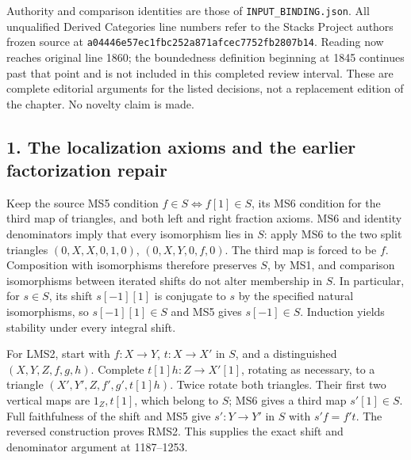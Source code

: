 \documentclass[11pt]{article}
\begin{document}
Authority and comparison identities are those of \texttt{INPUT\_\allowbreak{}BINDING.\allowbreak{}json}. All unqualified Derived Categories line numbers refer to the Stacks Project authors\textquotesingle{} frozen source at \texttt{a04446e5\allowbreak{}7ec1fbc2\allowbreak{}52a871af\allowbreak{}cec7752f\allowbreak{}b2807b14}. Reading now reaches original line 1860; the boundedness definition beginning at 1845 continues past that point and is not included in this completed review interval. These are complete editorial arguments for the listed decisions,\allowbreak{} not a replacement edition of the chapter. No novelty claim is made.

\subsection{1. The localization axioms and the earlier factorization repair}\label{proofs-1149-1843-the-localization-axioms-and-the-earlier-factorization-repair}

Keep the source MS5 condition \(f\in S\iff f[1]\in S\),\allowbreak{} its MS6 condition for the third map of triangles,\allowbreak{} and both left and right fraction axioms. MS6 and identity denominators imply that every isomorphism lies in \(S\):\allowbreak{} apply MS6 to the two split triangles \((0,X,X,0,1,0)\),\allowbreak{} \((0,X,Y,0,f,0)\). The third map is forced to be \(f\). Composition with isomorphisms therefore preserves \(S\),\allowbreak{} by MS1,\allowbreak{} and comparison isomorphisms between iterated shifts do not alter membership in \(S\). In particular,\allowbreak{} for \(s\in S\),\allowbreak{} its shift \(s[-1][1]\) is conjugate to \(s\) by the specified natural isomorphisms,\allowbreak{} so \(s[-1][1]\in S\) and MS5 gives \(s[-1]\in S\). Induction yields stability under every integral shift.

For LMS2,\allowbreak{} start with \(f:X\to Y\),\allowbreak{} \(t:X\to X'\) in \(S\),\allowbreak{} and a distinguished \((X,Y,Z,f,g,h)\). Complete \(t[1]h:Z\to X'[1]\),\allowbreak{} rotating as necessary,\allowbreak{} to a triangle \((X',Y',Z,f',g',t[1]h)\). Twice rotate both triangles. Their first two vertical maps are \(1_Z,t[1]\),\allowbreak{} which belong to \(S\); MS6 gives a third map \(s'[1]\in S\). Full faithfulness of the shift and MS5 give \(s':Y\to Y'\) in \(S\) with \(s'f=f't\). The reversed construction proves RMS2. This supplies the exact shift and denominator argument at 1187–\allowbreak{}1253.
\end{document}
